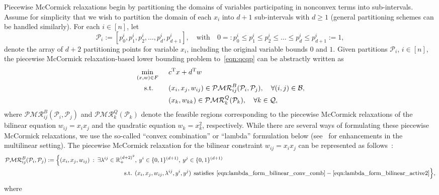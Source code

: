 \documentclass{article}
\newcommand{\pmc}{piecewise McCormick}
\newcommand{\pp}{partitioning points}
\newcommand{\R}{\mathbb{R}}
\begin{document}
Piecewise McCormick relaxations begin by partitioning the domains of variables participating in nonconvex terms into sub-intervals.
Assume for simplicity that we wish to partition the domain of each $x_i$ into $d+1$ sub-intervals with $d \geq 1$ (general partitioning schemes can be handled similarly).
For each $i \in [n]$, let 
\[
\mathcal{P}_i := [p^i_0, p^i_1, p^i_2,\dots,p^i_d, p^i_{d+1}], \quad \text{with} \quad 0 =: p^i_0 \leq p^i_1 \leq p^i_2 \leq \dots \leq p^i_d \leq p^i_{d+1} := 1,
\]
denote the array of $d+2$ {\pp} for variable $x_i$, including the original variable bounds $0$ and $1$.
Given partitions $\mathcal{P}_i$, $i \in [n]$, the {\pmc} relaxation-based lower bounding problem to~\eqref{eqn:qcqp} can be abstractly written as
\begin{alignat}{2}
\label{eqn:piecewise_mccormick}
&\min_{(x,w) \in F} \:\: && c^{\textup{T}} x + d^{\textup{T}} w \\
&\quad\: \text{s.t.} && (x_i, x_j, w_{ij}) \in \mathcal{PMR}^{B}_{ij}(\mathcal{P}_i,\mathcal{P}_j), \quad \forall (i, j) \in \mathcal{B}, \nonumber\\
& && (x_k, w_{kk}) \in \mathcal{PMR}^{Q}_k(\mathcal{P}_k), \quad \forall k \in \mathcal{Q}, \nonumber
\end{alignat}
where $\mathcal{PMR}^B_{ij}(\mathcal{P}_i, \mathcal{P}_j)$ and $\mathcal{PMR}^{Q}_{k}(\mathcal{P}_k)$
denote the feasible regions corresponding to the {\pmc} relaxations of the bilinear equation $w_{ij} = x_i x_j$ and the quadratic equation $w_k = x^2_k$, respectively.
While there are several ways of formulating these {\pmc} relaxations, we use the so-called ``convex combination'' or ``lambda'' formulation below (see~\cite{kim2022piecewise} for enhancements in the multilinear setting).
The piecewise \mbox{McCormick} relaxation for the bilinear constraint $w_{ij} = x_i x_j$ can be represented as follows~\cite{sundar2021piecewise}:
\begin{align*}
\mathcal{PMR}^B_{ij}(\mathcal{P}_i, \mathcal{P}_j) &:= \Big\{ (x_i, x_j, w_{ij}) \: : \: \exists \lambda^{ij} \in \R^{(d+2)^2}_+, \: y^{i} \in \{0,1\}^{(d+1)}, \: y^{j} \in \{0,1\}^{(d+1)} \\
&\hspace*{1.8in} \text{s.t.} \:\: (x_i, x_j, w_{ij}, \lambda^{ij}, y^{i}, y^{j}) \:\: \text{satisfies} \:\: \eqref{eqn:lambda_form_bilinear_conv_comb}-\eqref{eqn:lambda_form_bilinear_active2} \Big\},
\end{align*}
where
\end{document}
